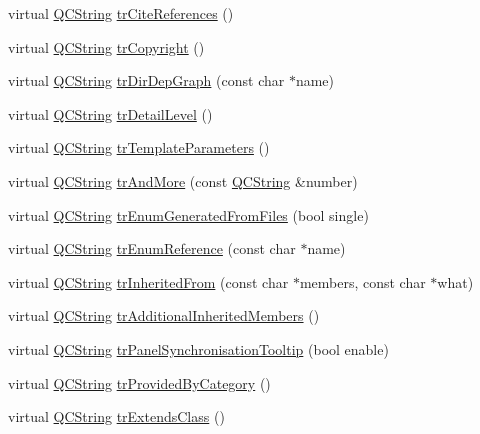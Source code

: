 \begin{DoxyCompactItemize}
\item 
virtual \hyperlink{class_q_c_string}{Q\-C\-String} \hyperlink{class_translator_dutch_ae43b2c6dbb1637144e32cd13a0d4704c}{tr\-Cite\-References} ()
\item 
virtual \hyperlink{class_q_c_string}{Q\-C\-String} \hyperlink{class_translator_dutch_a840474c30dfc2d4e92d1a29c5d1bf343}{tr\-Copyright} ()
\item 
virtual \hyperlink{class_q_c_string}{Q\-C\-String} \hyperlink{class_translator_dutch_abbe522be6eed72f54409458a1896323c}{tr\-Dir\-Dep\-Graph} (const char $\ast$name)
\item 
virtual \hyperlink{class_q_c_string}{Q\-C\-String} \hyperlink{class_translator_dutch_a138b581235bf64a0338ed25ee0d1ad61}{tr\-Detail\-Level} ()
\item 
virtual \hyperlink{class_q_c_string}{Q\-C\-String} \hyperlink{class_translator_dutch_ad9599164391093757c91bbe746f694a5}{tr\-Template\-Parameters} ()
\item 
virtual \hyperlink{class_q_c_string}{Q\-C\-String} \hyperlink{class_translator_dutch_a391327398836ee03f1d00415b80cb997}{tr\-And\-More} (const \hyperlink{class_q_c_string}{Q\-C\-String} \&number)
\item 
virtual \hyperlink{class_q_c_string}{Q\-C\-String} \hyperlink{class_translator_dutch_a2039b9a9624800366462f980e8ebce70}{tr\-Enum\-Generated\-From\-Files} (bool single)
\item 
virtual \hyperlink{class_q_c_string}{Q\-C\-String} \hyperlink{class_translator_dutch_a0209ef4cc7768fc9abf62f7ffc95534e}{tr\-Enum\-Reference} (const char $\ast$name)
\item 
virtual \hyperlink{class_q_c_string}{Q\-C\-String} \hyperlink{class_translator_dutch_af8b8b1bb56a7ea74b11dad76e644968e}{tr\-Inherited\-From} (const char $\ast$members, const char $\ast$what)
\item 
virtual \hyperlink{class_q_c_string}{Q\-C\-String} \hyperlink{class_translator_dutch_a62da1a83afa60109108fba6ad327a06f}{tr\-Additional\-Inherited\-Members} ()
\item 
virtual \hyperlink{class_q_c_string}{Q\-C\-String} \hyperlink{class_translator_dutch_a1800c322fe577f6dfab2ab8eb463a78e}{tr\-Panel\-Synchronisation\-Tooltip} (bool enable)
\item 
virtual \hyperlink{class_q_c_string}{Q\-C\-String} \hyperlink{class_translator_dutch_a48bb5cf8c4d20b9215921504ca43c8cf}{tr\-Provided\-By\-Category} ()
\item 
virtual \hyperlink{class_q_c_string}{Q\-C\-String} \hyperlink{class_translator_dutch_a943bb1d0d3cf3c3ddca3616c21f815da}{tr\-Extends\-Class} ()

\end{DoxyCompactItemize}
